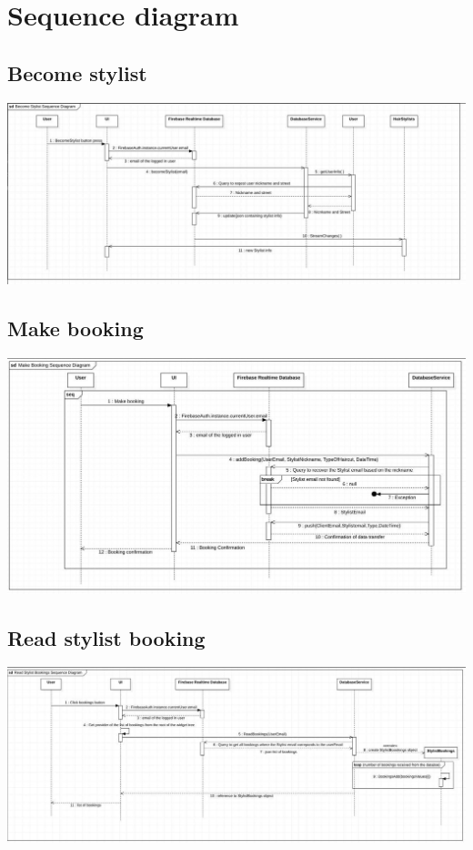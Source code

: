 \documentclass{article}
\begin{document}
\section{Sequence diagram}
\subsection{Become stylist}
\includegraphics[scale=0.45]{ImmaginiUML/Sequence1.jpg}
\subsection{Make booking}
\includegraphics[scale=0.45]{ImmaginiUML/Sequence2.jpg}
\subsection{Read stylist booking}
\includegraphics[scale=0.45]{ImmaginiUML/Sequence3.jpg}
\end{document}
